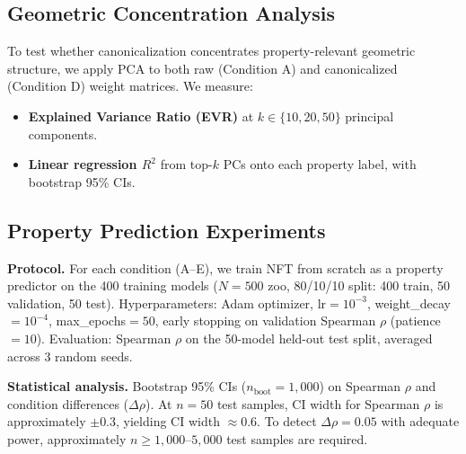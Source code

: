 \subsection{Geometric Concentration Analysis}

To test whether canonicalization concentrates property-relevant geometric structure, we apply PCA to both raw (Condition A) and canonicalized (Condition D) weight matrices. We measure:
\begin{itemize}
\item \textbf{Explained Variance Ratio (EVR)} at $k \in \{10, 20, 50\}$ principal components.
\item \textbf{Linear regression $R^2$} from top-$k$ PCs onto each property label, with bootstrap 95\% CIs.
\end{itemize}

\subsection{Property Prediction Experiments}

\textbf{Protocol.} For each condition (A--E), we train NFT from scratch as a property predictor on the 400 training models ($N=500$ zoo, 80/10/10 split: 400 train, 50 validation, 50 test). Hyperparameters: Adam optimizer, lr$=10^{-3}$, weight\_decay$=10^{-4}$, max\_epochs$=50$, early stopping on validation Spearman $\rho$ (patience$=10$). Evaluation: Spearman $\rho$ on the 50-model held-out test split, averaged across 3 random seeds.

\textbf{Statistical analysis.} Bootstrap 95\% CIs ($n_{\mathrm{boot}}=1{,}000$) on Spearman $\rho$ and condition differences ($\Delta\rho$). At $n=50$ test samples, CI width for Spearman $\rho$ is approximately $\pm 0.3$, yielding CI width $\approx 0.6$. To detect $\Delta\rho = 0.05$ with adequate power, approximately $n \geq 1{,}000$--$5{,}000$ test samples are required.
